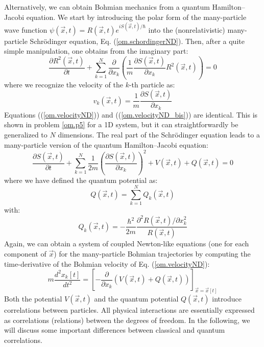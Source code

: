 \documentclass[onecolumn,nofootinbib, secnumarabic, amsmath, nobibnotes,11pt,aps,pra]{revtex4-1}
\newcommand{\pref}[1]{(\ref{#1})}
\newcommand{\eref}[1]{Eq. (\ref{#1})}
\begin{document}
Alternatively, we can obtain Bohmian mechanics from a quantum Hamilton--Jacobi equation. We start by introducing the polar form of the many-particle wave function $\psi(\vec{x},t) = R(\vec{x},t) e^{i S(\vec{x},t)/\hbar}$ into the (nonrelativistic) many-particle Schr\"odinger equation, \eref{om.schordingerND}. Then, after a quite simple manipulation, one obtains from the imaginary part:
\begin{equation}
\label{om.charge_conservationND}
\frac{\partial R^{2}(\vec{x},t)}{\partial t} + \sum_{k = 1}^{N} \frac {\partial } {\partial x_k} \left(\frac {1} {m} \frac {\partial S(\vec{x},t)}{\partial x_k} R^2(\vec{x},t) \right) = 0
\end{equation}
where we recognize the velocity of the $k$-th particle as:
\begin{equation}
\label{om.velocityND_bis}
v_k(\vec{x},t) = \frac {1} {m} \frac {\partial S(\vec{x},t)}{\partial x_k}
\end{equation}
Equations (\pref{om.velocityND}) and (\pref{om.velocityND_bis}) are
identical. This is shown in problem \ref{om.p5} for a 1D system, but
it can straightforwardly be generalized to $N$ dimensions. The real
part of the Schr\"odinger equation leads to a many-particle version
of the quantum Hamilton--Jacobi equation:
\begin{equation}
\label{om.Hamilton_JacobiND}
\frac{\partial S(\vec{x},t)}{\partial t} + \sum_{k = 1}^{N} \frac {1} {2 m} \left(\frac{{\partial} S(\vec{x},t)} {\partial x_k} \right)^2 + V(\vec{x},t) + Q(\vec{x},t) = 0 
\end{equation}
where we have defined the quantum potential as:
\begin{equation}
\label{om.quantum_potentialND_total}
Q(\vec{x},t) = \sum_{k = 1}^{N} Q_k(\vec{x},t)
\end{equation}
with:
\begin{equation}
\label{om.quantum_potentialND_parcial}
Q_k(\vec{x},t) = -\frac{\hbar^2} {2 m} \frac{{\partial}^2 R(\vec{x},t)/ \partial x^2_k} {R(\vec{x},t)}
\end{equation}
Again, we can obtain a system of coupled Newton-like equations (one for each component of $\vec{x}$) for the many-particle Bohmian trajectories by computing the time-derivative of the Bohmian velocity of \eref{om.velocityND}:
\begin{equation}
\label{om.NewtonlikeMP}
m\frac{d^2x_k[t]} {dt^2} = \left [-\frac{\partial} {\partial x_k} \left( V(\vec{x},t) + Q(\vec{x},t)\right)  \right ] _{\vec x = \vec x[t]}
\end{equation}
Both the potential $V(\vec{x},t)$ and the quantum potential
$Q(\vec{x},t)$ introduce correlations between particles. All
physical interactions are essentially expressed as correlations (relations)
between the degrees of freedom. In the following, we will discuss
some important differences between classical and quantum
correlations.
\end{document}
